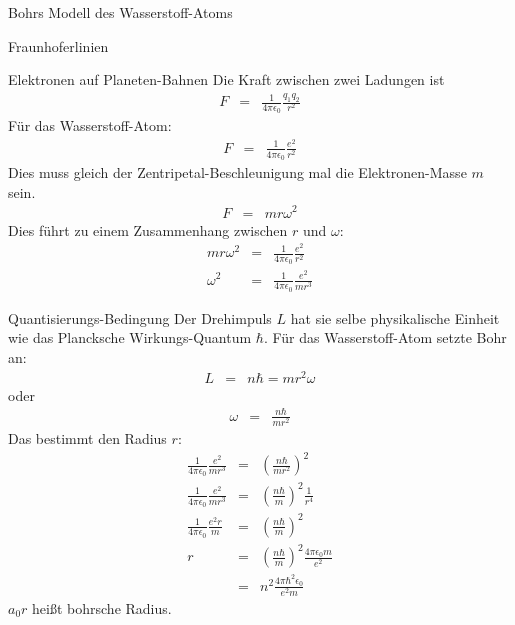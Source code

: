 \begin{chapter}{\titlestr}
\begin{section}{Bohrs Modell des Wasserstoff-Atoms}
\begin{subsection}{Fraunhoferlinien}
\end{subsection}
\begin{subsection}{Elektronen auf Planeten-Bahnen}
Die Kraft zwischen zwei Ladungen ist
\begin{eqnarray*}
F &=& \frac{1}{4\pi\epsilon_0}\frac{q_1q_2}{r^2}
\end{eqnarray*}
Für das Wasserstoff-Atom:
\begin{eqnarray*}
F &=& \frac{1}{4\pi\epsilon_0}\frac{e^2}{r^2}
\end{eqnarray*}
Dies muss gleich der Zentripetal-Beschleunigung mal die Elektronen-Masse $m$ sein.
\begin{eqnarray*}
F &=& mr\omega^2
\end{eqnarray*}
Dies führt zu einem Zusammenhang zwischen $r$ und $\omega$:
\begin{eqnarray*}
mr\omega^2&=& \frac{1}{4\pi\epsilon_0}\frac{e^2}{r^2}\\
\omega^2&=& \frac{1}{4\pi\epsilon_0}\frac{e^2}{mr^3}
\end{eqnarray*}
\end{subsection}

\begin{subsection}{Quantisierungs-Bedingung}
Der Drehimpuls $L$ hat sie selbe physikalische Einheit wie das Plancksche Wirkungs-Quantum $\hbar$.
Für das Wasserstoff-Atom setzte Bohr an:
\begin{eqnarray}
\label{bohr_condition}
L &=& n\hbar = mr^2\omega
\end{eqnarray}
oder
\begin{eqnarray*}
\omega &=& \frac{n\hbar}{mr^2}
\end{eqnarray*}
Das bestimmt den Radius $r$:
\begin{eqnarray*}
\frac{1}{4\pi\epsilon_0}\frac{e^2}{mr^3} &=& \left(\frac{n\hbar}{mr^2}\right)^2\\
\frac{1}{4\pi\epsilon_0}\frac{e^2}{mr^3} &=& \left(\frac{n\hbar}{m}\right)^2\frac{1}{r^4}\\
\frac{1}{4\pi\epsilon_0}\frac{e^2r}{m} &=& \left(\frac{n\hbar}{m}\right)^2\\
r &=& \left(\frac{n\hbar}{m}\right)^2\frac{4\pi\epsilon_0m}{e^2}\\
&=&n^2\frac{4\pi\hbar^2\epsilon_0}{e^2m}
\end{eqnarray*}
$a_0r$ heißt bohrsche Radius.
\end{subsection}


\end{section}
\end{chapter}
